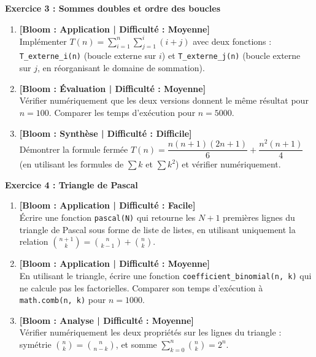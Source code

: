 \noindent\textbf{Exercice 3 : Sommes doubles et ordre des boucles}
\begin{enumerate}
    \item \textbf{[Bloom : Application | Difficulté : Moyenne]} \\
    Implémenter $T(n) = \sum_{i=1}^{n} \sum_{j=1}^{i} (i + j)$ avec deux fonctions :
    \texttt{T\_externe\_i(n)} (boucle externe sur $i$) et \texttt{T\_externe\_j(n)} (boucle externe sur $j$, en réorganisant le domaine de sommation).
    \item \textbf{[Bloom : Évaluation | Difficulté : Moyenne]} \\
    Vérifier numériquement que les deux versions donnent le même résultat pour $n = 100$. Comparer les temps d'exécution pour $n = 5000$.
    \item \textbf{[Bloom : Synthèse | Difficulté : Difficile]} \\
    Démontrer la formule fermée $T(n) = \dfrac{n(n+1)(2n+1)}{6} + \dfrac{n^2(n+1)}{4}$ (en utilisant les formules de $\sum k$ et $\sum k^2$) et vérifier numériquement.
\end{enumerate}

\vspace{0.3cm}

\noindent\textbf{Exercice 4 : Triangle de Pascal}
\begin{enumerate}
    \item \textbf{[Bloom : Application | Difficulté : Facile]} \\
    Écrire une fonction \texttt{pascal(N)} qui retourne les $N+1$ premières lignes du triangle de Pascal sous forme de liste de listes, en utilisant uniquement la relation $\binom{n+1}{k} = \binom{n}{k-1} + \binom{n}{k}$.
    \item \textbf{[Bloom : Application | Difficulté : Moyenne]} \\
    En utilisant le triangle, écrire une fonction \texttt{coefficient\_binomial(n, k)} qui ne calcule pas les factorielles. Comparer son temps d'exécution à \texttt{math.comb(n, k)} pour $n = 1000$.
    \item \textbf{[Bloom : Analyse | Difficulté : Moyenne]} \\
    Vérifier numériquement les deux propriétés sur les lignes du triangle :
    symétrie $\binom{n}{k} = \binom{n}{n-k}$, et somme $\sum_{k=0}^{n} \binom{n}{k} = 2^n$.
\end{enumerate}

\vspace{0.3cm}

